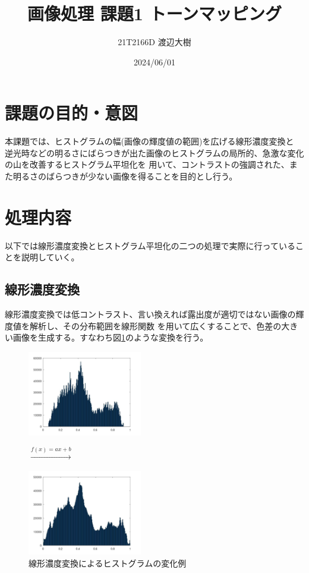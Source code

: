 \documentclass[a4paper,11pt,dvipdfmx]{jsarticle}
\begin{document}
\title{画像処理 課題1 トーンマッピング}
\author{21T2166D 渡辺大樹}
\date{2024/06/01}
\maketitle

\section{課題の目的・意図}
本課題では、ヒストグラムの幅(画像の輝度値の範囲)を広げる線形濃度変換と
逆光時などの明るさにばらつきが出た画像のヒストグラムの局所的、急激な変化の山を改善するヒストグラム平坦化を
用いて、コントラストの強調された、また明るさのばらつきが少ない画像を得ることを目的とし行う。

\section{処理内容}
以下では線形濃度変換とヒストグラム平坦化の二つの処理で実際に行っていることを説明していく。
\subsection{線形濃度変換}
線形濃度変換では低コントラスト、言い換えれば露出度が適切ではない画像の輝度値を解析し、その分布範囲を線形関数
を用いて広くすることで、色差の大きい画像を生成する。すなわち図\ref{hist_1}のような変換を行う。
\begin{figure}[htbp]
    \centering
    \begin{minipage}{0.4\hsize}
        \centering
        \includegraphics[width=50mm]{./img/linear_ex.jpg}
    \end{minipage}
    \begin{minipage}{0.1\hsize}
        \centering
        \begin{math}
                \overset{f(x)=ax+b}{\to}
        \end{math}
    \end{minipage}
    \begin{minipage}{0.4\hsize}
        \centering
        \includegraphics[width=50mm]{./img/linear_ex1.jpg}
    \end{minipage}
    \caption{線形濃度変換によるヒストグラムの変化例}
    \label{hist_1}
\end{figure}
\end{document}
